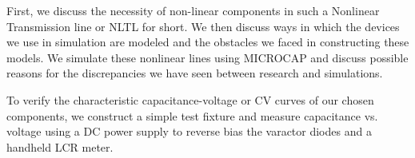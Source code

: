 \documentclass[journal]{IEEEtran}
\begin{document}
First, we discuss the necessity of non-linear components in such a Nonlinear Transmission line or NLTL for short. We then discuss ways in which the devices we use in simulation are modeled and the obstacles we faced in constructing these models. We simulate these nonlinear lines using MICROCAP and discuss possible reasons for the discrepancies we have seen between research and simulations. 

To verify the characteristic capacitance-voltage or CV curves of our chosen components, we construct a simple test fixture and measure capacitance vs. voltage using a DC power supply to reverse bias the varactor diodes and a handheld LCR meter. 



\hfill 



%
%

\end{document}
